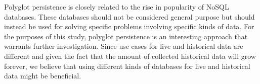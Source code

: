 Polyglot persistence is closely related to the rise in popularity of NoSQL databases. These databases should not be considered general purpose \cite{Catell, polyglotms} but should instead be used for solving specific problems involving specific kinds of data. For the purposes of this study, polyglot persistence is an interesting approach that warrants further investigation. Since use cases for live and historical data are different and given the fact that the amount of collected historical data will grow forever, we believe that using different kinds of databases for live and historical data might be beneficial.




%
%

